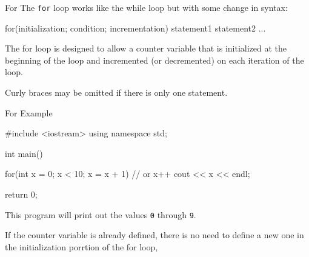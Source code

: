 \documentclass[../lecture3-flowofcontrol.tex]{subfiles}
\begin{document}

\begin{frame}[fragile]{For}
    The \texttt{for} loop works like the while loop but with some change in syntax:

\begin{cppcode}[]
for(initialization; condition; incrementation)
{
    statement1
    statement2
    ...
}
\end{cppcode}

    The for loop is designed to allow a counter variable that is initialized at the beginning of the loop and incremented (or decremented) on each iteration of the loop. \newline

    Curly braces may be omitted if there is only one statement.
\end{frame}

\begin{frame}[fragile]{For Example}
\begin{cppcode}[]
#include <iostream>
using namespace std;

int main()
{
    for(int x = 0; x < 10; x = x + 1) // or x++
        cout << x << endl;

    return 0;
}
\end{cppcode}

    This program will print out the values \texttt{0} through \texttt{9}. \newline

    If the counter variable is already defined, there is no need to define a new one in the initialization porrtion of the for loop,
\end{frame}

\end{document}
